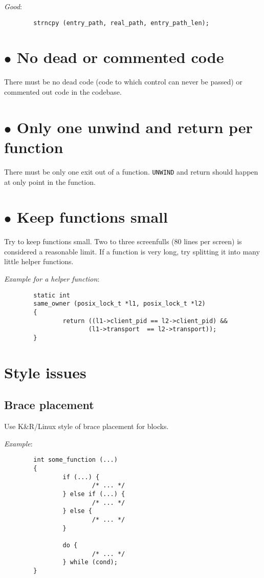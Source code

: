 \documentclass{article}[12pt]
\begin{document}
\textsl{Good}:

\begin{verbatim}
        strncpy (entry_path, real_path, entry_path_len);
\end{verbatim}

\section*{$\bullet$ No dead or commented code}
There must be no dead code (code to which control can never be passed) or 
commented out code in the codebase.

\section*{$\bullet$ Only one unwind and return per function}
There must be only one exit out of a function. \texttt{UNWIND} and return 
should happen at only point in the function.

\section*{$\bullet$ Keep functions small}
Try to keep functions small. Two to three screenfulls (80 lines per screen) is
considered a reasonable limit. If a function is very long, try splitting it
into many little helper functions.

\vspace{2ex}
\textsl{Example for a helper function}:
\begin{verbatim}
        static int
        same_owner (posix_lock_t *l1, posix_lock_t *l2)
        {
                return ((l1->client_pid == l2->client_pid) &&
                       (l1->transport  == l2->transport));
        }
\end{verbatim}

\section*{Style issues}

\subsection*{Brace placement}
Use K\&R/Linux style of brace placement for blocks.

\textsl{Example}:
\begin{verbatim}
        int some_function (...)
        {
                if (...) {
                        /* ... */
                } else if (...) {
                        /* ... */
                } else {
                        /* ... */
                }

                do {
                        /* ... */
                } while (cond);
        }
\end{verbatim}
\end{document}
